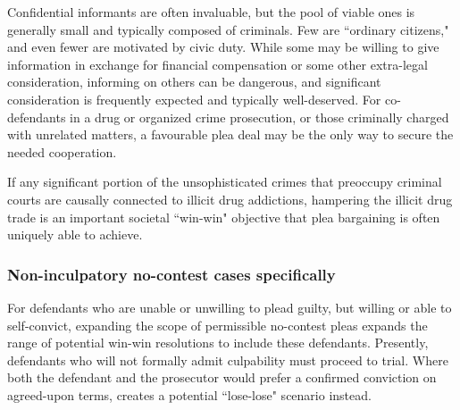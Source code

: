Confidential informants are often invaluable, but the pool of viable ones is generally small and typically composed of criminals. Few are ``ordinary citizens," and even fewer are motivated by civic duty. While some may be willing to give information in exchange for financial compensation or some other extra-legal consideration, informing on others can be dangerous, and significant consideration is frequently expected and typically well-deserved. For co-defendants in a drug or organized crime prosecution, or those criminally charged with unrelated matters, a favourable plea deal may be the only way to secure the needed cooperation. 

If any significant portion of the unsophisticated crimes that preoccupy criminal courts are causally connected to illicit drug addictions, hampering the illicit drug trade is an important societal ``win-win" objective that plea bargaining is often uniquely able to achieve. 

\subsubsection{Non-inculpatory no-contest cases specifically}

For defendants who are unable or unwilling to plead guilty, but willing or able to self-convict, expanding the scope of permissible no-contest pleas expands the range of potential win-win resolutions to include these defendants. Presently, defendants who will not formally admit culpability must proceed to trial. Where both the defendant and the prosecutor would prefer a confirmed conviction on agreed-upon terms, creates a potential ``lose-lose" scenario instead.

